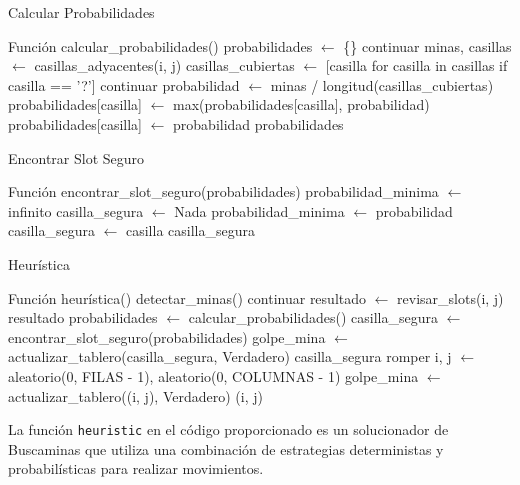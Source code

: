 \documentclass{article}
\begin{document}
\begin{algorithm}[H]
\caption{Calcular Probabilidades}
\begin{algorithmic}[1]
\STATE Función calcular\_probabilidades()
\STATE probabilidades $\leftarrow$ \{\}
\STATE continuar
\ENDIF
\STATE minas, casillas $\leftarrow$ casillas\_adyacentes(i, j)
\STATE casillas\_cubiertas $\leftarrow$ [casilla for casilla in casillas if casilla == '?']
\STATE continuar
\ENDIF
\STATE probabilidad $\leftarrow$ minas / longitud(casillas\_cubiertas)
\STATE probabilidades[casilla] $\leftarrow$ max(probabilidades[casilla], probabilidad)
\ELSE
\STATE probabilidades[casilla] $\leftarrow$ probabilidad
\ENDIF
\ENDFOR
\ENDFOR
\RETURN probabilidades
\end{algorithmic}
\end{algorithm}

\begin{algorithm}[H]
\caption{Encontrar Slot Seguro}
\begin{algorithmic}[1]
\STATE Función encontrar\_slot\_seguro(probabilidades)
\STATE probabilidad\_minima $\leftarrow$ infinito
\STATE casilla\_segura $\leftarrow$ Nada
\STATE probabilidad\_minima $\leftarrow$ probabilidad
\STATE casilla\_segura $\leftarrow$ casilla
\ENDIF
\ENDFOR
\RETURN casilla\_segura
\end{algorithmic}
\end{algorithm}

\begin{algorithm}[H]
\caption{Heurística}
\begin{algorithmic}[1]
\STATE Función heurística()
\STATE detectar\_minas()
\STATE continuar
\ENDIF
\STATE resultado $\leftarrow$ revisar\_slots(i, j)
\RETURN resultado
\ENDIF
\ENDFOR
\STATE probabilidades $\leftarrow$ calcular\_probabilidades()
\STATE casilla\_segura $\leftarrow$ encontrar\_slot\_seguro(probabilidades)
\STATE golpe\_mina $\leftarrow$ actualizar\_tablero(casilla\_segura, Verdadero)
\RETURN casilla\_segura
\ENDIF
\ELSE
\STATE romper
\ENDIF
\ENDWHILE
{}
\STATE i, j $\leftarrow$ aleatorio(0, FILAS - 1), aleatorio(0, COLUMNAS - 1)
\STATE golpe\_mina $\leftarrow$ actualizar\_tablero((i, j), Verdadero)
\RETURN (i, j)
\ENDIF
\ENDIF
\ENDWHILE
\end{algorithmic}
\end{algorithm}
La función \texttt{heuristic} en el código proporcionado es un solucionador de Buscaminas que utiliza una combinación de estrategias deterministas y probabilísticas para realizar movimientos.
\end{document}

